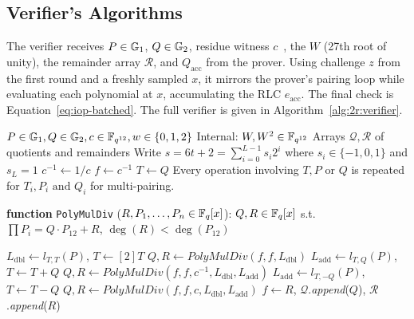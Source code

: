 \subsection{Verifier's Algorithms}

The verifier receives $P \in \mathbb{G}_1$, $Q \in \mathbb{G}_2$, residue witness $c$~\cite{OPP24}, the $W$ (27th root of unity), the remainder array $\mathcal{R}$, and $Q_\text{acc}$ from the prover. Using challenge $z$ from the first round and a freshly sampled $x$, it mirrors the prover's pairing loop while evaluating each polynomial at $x$, accumulating the RLC $e_\text{acc}$. The final check is Equation~\ref{eq:iop-batched}. The full verifier is given in Algorithm~\ref{alg:2r:verifier}.


\begin{algorithm}[H]
\caption{Pairing Prover: Preparing polynomials}
\label{alg:2r:prover}
\begin{algorithmic}[1]
\Require $P \in \mathbb{G}_1, Q \in \mathbb{G}_2, c \in \mathbb{F}_{q^{12}}, w \in \{0,1,2\}$
\Statex Internal: $W, W^2 \in \mathbb{F}_{q^{12}}$ 
\Ensure Arrays $\mathcal{Q}, \mathcal{R}$ of quotients and remainders
\Statex Write $s = 6t + 2 = \sum_{i=0}^{L-1} s_i 2^i$ where $s_i \in \{-1, 0, 1\}$ and $s_L = 1$
\State $c^{-1} \leftarrow 1 / c$ 
\State $f \leftarrow c^{-1}$ 
\State $T \leftarrow Q$ 
\color{gray}
\Statex \small{Every operation involving $T, P \text{ or } Q$ is repeated for $T_i, P_i \text{ and } Q_i$ for multi-pairing.}
\color{black}

\Statex

\State \textbf{function} \texttt{PolyMulDiv} ({$R, P_1, \ldots, P_n \in \mathbb{F}_q[x]$}): \Return $Q, R \in \mathbb{F}_q[x]$ 
\State \qquad s.t.\ $\prod P_i = Q \cdot P_{12} + R$, $\deg(R) < \deg(P_{12})$

\Statex
\Statex {}
    \State $L_\text{dbl} \leftarrow l_{T,T}(P)$, $T \leftarrow [2]T$
		\State $Q, R \leftarrow {\textit{PolyMulDiv}}(f, f, L_\text{dbl})$ 
        \State $L_\text{add} \leftarrow l_{T,Q}(P)$, $T \leftarrow T + Q$
        \State $Q, R \leftarrow {\textit{PolyMulDiv}}(f, f, c^{-1}, L_\text{dbl}, L_\text{add})$ 
        \State $L_\text{add} \leftarrow l_{T,-Q}(P)$, $T \leftarrow T - Q$
        \State $Q, R \leftarrow {\textit{PolyMulDiv}}(f, f, c, L_\text{dbl}, L_\text{add})$ 
    \EndIf
    \State $f \leftarrow R$, $\mathcal{Q}$.\textit{append}($Q$), $\mathcal{R}$.\textit{append}($R$)
\EndFor
\Statex



\end{algorithmic}
\end{algorithm}
